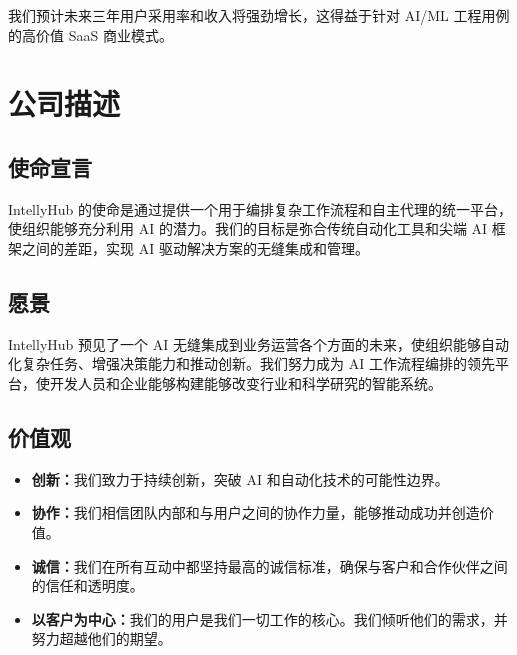 \documentclass[11pt, a4paper, oneside]{article}
\begin{document}
我们预计未来三年用户采用率和收入将强劲增长，这得益于针对 AI/ML 工程用例的高价值 SaaS 商业模式。

\section{公司描述}
\subsection{使命宣言}
IntellyHub 的使命是通过提供一个用于编排复杂工作流程和自主代理的统一平台，使组织能够充分利用 AI 的潜力。我们的目标是弥合传统自动化工具和尖端 AI 框架之间的差距，实现 AI 驱动解决方案的无缝集成和管理。

\subsection{愿景}
IntellyHub 预见了一个 AI 无缝集成到业务运营各个方面的未来，使组织能够自动化复杂任务、增强决策能力和推动创新。我们努力成为 AI 工作流程编排的领先平台，使开发人员和企业能够构建能够改变行业和科学研究的智能系统。

\subsection{价值观}
\begin{itemize}
    \item \textbf{创新：}我们致力于持续创新，突破 AI 和自动化技术的可能性边界。
    \item \textbf{协作：}我们相信团队内部和与用户之间的协作力量，能够推动成功并创造价值。
    \item \textbf{诚信：}我们在所有互动中都坚持最高的诚信标准，确保与客户和合作伙伴之间的信任和透明度。
    \item \textbf{以客户为中心：}我们的用户是我们一切工作的核心。我们倾听他们的需求，并努力超越他们的期望。
\end{itemize}
\end{document}
